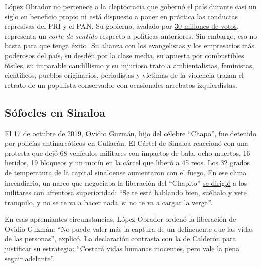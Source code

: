 López Obrador no pertenece a la cleptocracia que gobernó el país durante
casi un siglo en beneficio propio ni está dispuesto a poner en práctica
las conductas represivas del PRI y el PAN. Su gobierno, avalado por
\href{https://computos2018.ine.mx/\#/presidencia/nacional/1/1/1/1}{30
millones de votos}, representa un \emph{corte de sentido} respecto a
políticas anteriores. Sin embargo, eso no basta para que tenga éxito. Su
alianza con los evangelistas y los empresarios más poderosos del país,
su desdén por la
\href{https://www.nytimes.com/es/2020/07/06/espanol/opinion/clase-media-mexico.html}{clase
media}, su apuesta por combustibles fósiles, su imparable caudillismo y
su injurioso trato a ambientalistas, feministas, científicos, pueblos
originarios, periodistas y víctimas de la violencia trazan el retrato de
un populista conservador con ocasionales arrebatos izquierdistas.

\hypertarget{suxf3focles-en-sinaloa}{%
\subsection{Sófocles en Sinaloa}\label{suxf3focles-en-sinaloa}}

El 17 de octubre de 2019, Ovidio Guzmán, hijo del célebre ``Chapo'',
\href{https://www.nytimes.com/2019/10/18/world/americas/mexico-cartel-chapo-son-guzman.html}{fue
detenido} por policías antinarcóticos en Culiacán. El Cártel de Sinaloa
reaccionó con una protesta que dejó 68 vehículos militares con impactos
de bala, ocho muertos, 16 heridos, 19 bloqueos y un motín en la cárcel
que liberó a 45 reos. Los 32 grados de temperatura de la capital
sinaloense aumentaron con el fuego. En ese clima incendiario, un narco
que negociaba la liberación del ``Chapito''
\href{https://elpais.com/internacional/2019/10/18/mexico/1571422172_123900.html}{se
dirigió} a los militares con afrentosa superioridad: ``Se te está
hablando bien, suéltalo y vete tranquilo, y no se te va a hacer nada, si
no te va a cargar la verga''.

En esas apremiantes circunstancias, López Obrador ordenó la liberación
de Ovidio Guzmán: ``No puede valer más la captura de un delincuente que
las vidas de las personas'',
\href{https://www.gob.mx/presidencia/prensa/no-puede-valer-mas-la-captura-de-un-delincuente-que-las-vidas-de-las-personas-afirma-presidente-en-oaxaca}{explicó}.
La declaración contrasta
\href{https://heraldodemexico.com.mx/pais/amlo-salva-vidas-inocentes-calderon-decia-que-se-perderian-valdria-la-pena/}{con
la de Calderón} para justificar su estrategia: ``Costará vidas humanas
inocentes, pero vale la pena seguir adelante''.

